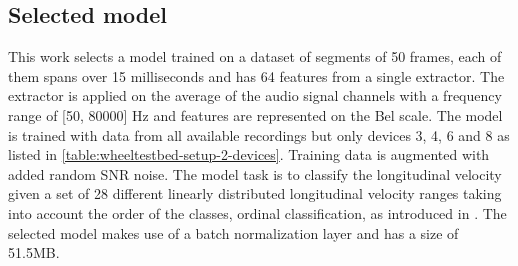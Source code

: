 \subsection{Selected model} \label{subsec:selected-model} 

This work selects a model trained on a dataset of segments of 50 frames, each
of them spans over 15 milliseconds and has 64 features from a single
 extractor. The extractor is applied on
the average of the audio signal channels with a frequency range of [50, 80000]
Hz and features are represented on the Bel scale. The model is trained with
data from all available recordings but only devices 3, 4, 6 and 8 as listed in
\cref{table:wheeltestbed-setup-2-devices}. Training data is augmented with
added random SNR noise. The model task is to classify the longitudinal velocity
given a set of 28 different linearly distributed longitudinal velocity ranges
taking into account the order of the classes, ordinal classification, as
introduced in \cite{ordclass2006}. The selected model makes use of a batch
normalization layer and has a size of 51.5MB. 